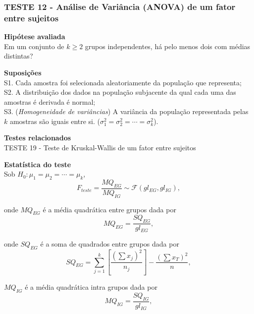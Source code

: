 \documentclass[
]{book}
\theoremstyle{definition}
\theoremstyle{definition}
\theoremstyle{definition}
\theoremstyle{remark}
\begin{document}
\hypertarget{teste-12---anuxe1lise-de-variuxe2ncia-anova-de-um-fator-entre-sujeitos}{%
\subsubsection*{TESTE 12 - Análise de Variância (ANOVA) de um fator entre sujeitos}\label{teste-12---anuxe1lise-de-variuxe2ncia-anova-de-um-fator-entre-sujeitos}}

\textbf{Hipótese avaliada}\\
Em um conjunto de \(k \ge 2\) grupos independentes, há pelo menos dois com médias distintas?

\textbf{Suposições}\\
S1. Cada amostra foi selecionada aleatoriamente da população que representa;\\
S2. A distribuição dos dados na população subjacente da qual cada uma das amostras é derivada é normal;\\
S3. (\emph{Homogeneidade de variâncias}) A variância da população representada pelas \(k\) amostras são iguais entre si. (\(\sigma_1^2=\sigma_2^2=\cdots=\sigma_k^2\)).

\textbf{Testes relacionados}\\
TESTE 19 - Teste de Kruskal-Wallis de um fator entre sujeitos

\textbf{Estatística do teste}\\
Sob \(H_0: \mu_1=\mu_2=\cdots=\mu_k\),
\begin{equation}
F_{teste} = \frac{MQ_{EG}}{MQ_{IG}} \sim \mathcal{F}(gl_{EG},gl_{IG}),
\label{eq:anova-1fat-entre-suj}
\end{equation}

onde \(MQ_{EG}\) é a média quadrática entre grupos dada por
\begin{equation}
MQ_{EG} = \frac{SQ_{EG}}{gl_{EG}},
\label{eq:mq-entre}
\end{equation}

onde \(SQ_{EG}\) é a soma de quadrados entre grupos dada por
\begin{equation}
SQ_{EG} = \sum_{j=1}^k \left[ \frac{(\sum x_j)^2}{n_j} \right] - \frac{(\sum x_T)^2}{n},
\label{eq:sq-entre}
\end{equation}

\(MQ_{IG}\) é a média quadrática intra grupos dada por
\begin{equation}
MQ_{IG} = \frac{SQ_{IG}}{gl_{IG}},
\label{eq:mq-intra}
\end{equation}
\end{document}
